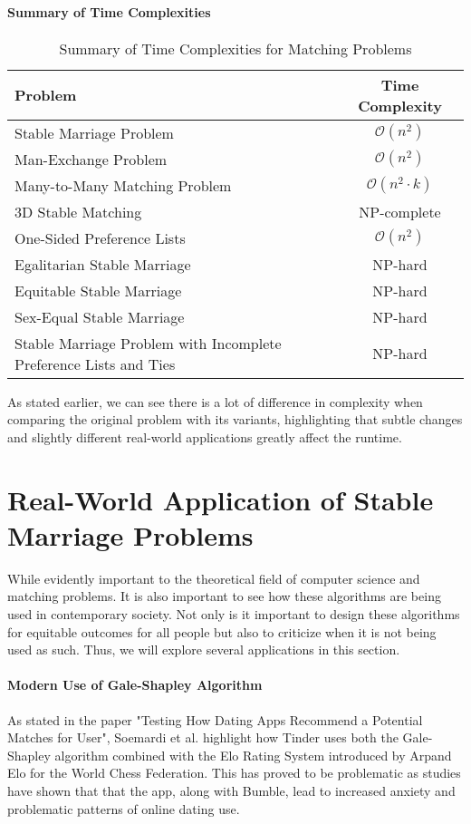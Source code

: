\paragraph{Summary of Time Complexities}
\begin{table}[h!]
\centering
\begin{tabular}{|p{7cm}|c|}
\hline
\textbf{Problem} & \textbf{Time Complexity} \\
\hline
Stable Marriage Problem & \(\mathcal{O}(n^2)\) \\
Man-Exchange Problem & \(\mathcal{O}(n^2)\) \\
Many-to-Many Matching Problem & \(\mathcal{O}(n^2 \cdot k)\) \\
3D Stable Matching & NP-complete \\
One-Sided Preference Lists & \(\mathcal{O}(n^2)\) \\
Egalitarian Stable Marriage & NP-hard \\
Equitable Stable Marriage & NP-hard \\
Sex-Equal Stable Marriage & NP-hard \\
Stable Marriage Problem with Incomplete Preference Lists and Ties & NP-hard \\
\hline
\end{tabular}
\caption{Summary of Time Complexities for Matching Problems}
\end{table}

As stated earlier, we can see there is a lot of difference in complexity when comparing the original problem with its variants, highlighting that subtle changes and slightly different real-world applications greatly affect the runtime.

\section*{Real-World Application of Stable Marriage Problems}
While evidently important to the theoretical field of computer science and matching problems. It is also important to see how these algorithms are being used in contemporary society. Not only is it important to design these algorithms for equitable outcomes for all people but also to criticize when it is not being used as such. Thus, we will explore several applications in this section.

\paragraph{Modern Use of Gale-Shapley Algorithm} As stated in the paper "Testing How Dating Apps Recommend a Potential Matches for User", Soemardi et al. highlight how Tinder uses both the Gale-Shapley algorithm combined with the Elo Rating System introduced by Arpand Elo for the World Chess Federation. This has proved to be problematic as studies have shown that that the app, along with Bumble, lead to increased anxiety and problematic patterns of online dating use. \cite{calvin}

